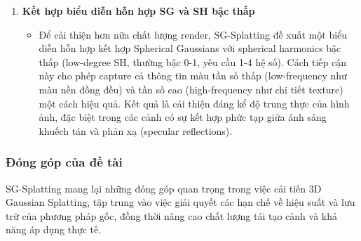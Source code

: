 \begin{enumerate}
\begin{itemize}
        \item Kỹ thuật này được thực hiện thông qua một thuật toán phân cụm (clustering) dựa trên spatial-temporal features, đảm bảo phân bố Gaussians hợp lý, giảm lãng phí tài nguyên mà vẫn giữ được tính toàn vẹn của cảnh.
    \end{itemize}
    \item \textbf{Kết hợp biểu diễn hỗn hợp SG và SH bậc thấp}
    \begin{itemize}
        \item Để cải thiện hơn nữa chất lượng render, SG-Splatting đề xuất một biểu diễn hỗn hợp kết hợp Spherical Gaussians với spherical harmonics bậc thấp (low-degree SH, thường bậc 0-1, yêu cầu 1-4 hệ số). Cách tiếp cận này cho phép capture cả thông tin màu tần số thấp (low-frequency như màu nền đồng đều) và tần số cao (high-frequency như chi tiết texture) một cách hiệu quả. Kết quả là cải thiện đáng kể độ trung thực của hình ảnh, đặc biệt trong các cảnh có sự kết hợp phức tạp giữa ánh sáng khuếch tán và phản xạ (specular reflections).
    \end{itemize}
\end{enumerate}
\subsubsection{Đóng góp của đề tài}
SG-Splatting mang lại những đóng góp quan trọng trong việc cải tiến 3D Gaussian Splatting, tập trung vào việc giải quyết các hạn chế về hiệu suất và lưu trữ của phương pháp gốc, đồng thời nâng cao chất lượng tái tạo cảnh và khả năng áp dụng thực tế. \\

